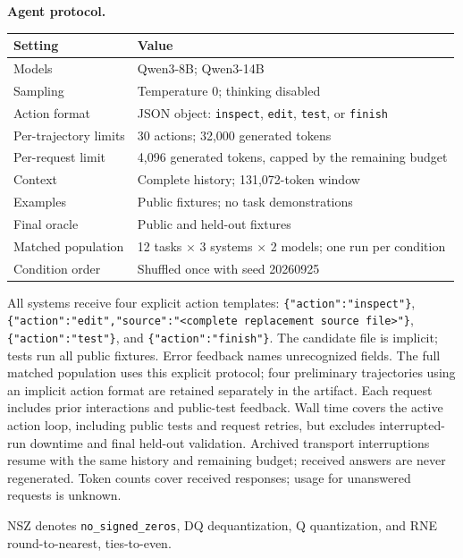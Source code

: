\noindent\textbf{Agent protocol.}\par\smallskip
\begingroup
\small
\setlength{\tabcolsep}{4pt}
\renewcommand{\arraystretch}{1.05}
\noindent\begin{tabular}{@{}p{}p{}@{}}
\toprule
Setting & Value \\
\midrule
Models & Qwen3-8B; Qwen3-14B \\
Sampling & Temperature 0; thinking disabled \\
Action format & JSON object: \texttt{inspect}, \texttt{edit}, \texttt{test}, or \texttt{finish} \\
Per-trajectory limits & 30 actions; 32,000 generated tokens \\
Per-request limit & 4,096 generated tokens, capped by the remaining budget \\
Context & Complete history; 131,072-token window \\
Examples & Public fixtures; no task demonstrations \\
Final oracle & Public and held-out fixtures \\
Matched population & 12 tasks $\times$ 3 systems $\times$ 2 models; one run per condition \\
Condition order & Shuffled once with seed 20260925 \\
\bottomrule
\end{tabular}
\endgroup
\par\medskip

All systems receive four explicit action templates:
\texttt{\{"action":"inspect"\}},
\texttt{\{"action":"edit","source":"<complete replacement source file>"\}},
\texttt{\{"action":"test"\}}, and \texttt{\{"action":"finish"\}}.
The candidate file is implicit; tests run all public fixtures. Error feedback
names unrecognized fields. The full matched population uses this explicit
protocol; four preliminary trajectories using an implicit action format are
retained separately in the artifact. Each request includes prior interactions
and public-test feedback. Wall time covers the active action loop, including
public tests and request retries, but excludes interrupted-run downtime and
final held-out validation. Archived transport interruptions resume with the
same history and remaining budget; received answers are never regenerated.
Token counts cover received responses; usage for unanswered requests is unknown.

NSZ denotes \texttt{no\_signed\_zeros}, DQ dequantization, Q quantization,
and RNE round-to-nearest, ties-to-even.

